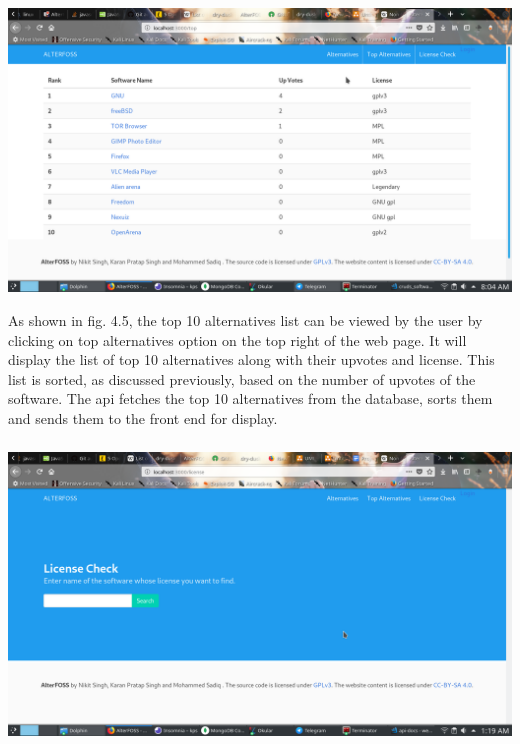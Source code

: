 \begin{center}
\includegraphics[scale=0.43]{images/4-3.png}
\end{center}

As shown in fig. 4.5, the top 10 alternatives list can be viewed by the user by clicking on top alternatives option on the top right of the web page. It will display the list of top 10 alternatives along with their upvotes and license. This list is sorted, as discussed previously, based on the number of upvotes of the software. The api fetches the top 10 alternatives from the database, sorts them and sends them to the front end for display.


\subsubsection{}

\begin{center}
\includegraphics[scale=0.44]{images/4-4.png}
\end{center}

